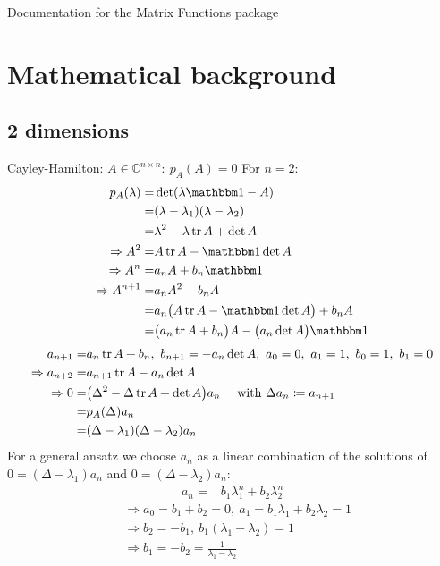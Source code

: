 \documentclass{article}
\begin{document}
\centerline{\sc \large Documentation for the Matrix Functions package}
\vspace{.5pc}
\vspace{2pc}

\tableofcontents

\section{Mathematical background}
\subsection{2 dimensions}
Cayley-Hamilton: $A\in \mathbb C^{n\times n}:\ p_A(A)=0$
For $n=2$:
\begin{align}
p_A(\lambda) =& \det(\lambda\mathbbm 1 - A) \nonumber\\
=& (\lambda - \lambda_1)(\lambda - \lambda_2) \nonumber\\
=& \lambda^2 -\lambda\tr A + \det A\\
\Rightarrow A^2 =& A \tr A - \mathbbm 1 \det A\\
\Rightarrow A^n =& a_n A + b_n\mathbbm 1\\
\Rightarrow A^{n+1} =& a_n A^2 + b_n A \nonumber\\
=& a_n \big( A\tr A - \mathbbm 1\det A \big) + b_n A \nonumber\\
=& \big(a_n\tr A + b_n\big)A - \big(a_n\det A \big)\mathbbm 1 \nonumber
\end{align}
\begin{align}
a_{n+1} =& a_n\tr A + b_n,\ b_{n+1} = -a_n\det A,\ a_0=0,\ a_1=1,\ b_0=1,\ b_1=0 \label{recurrent 2dim}\\
\Rightarrow a_{n+2} =& a_{n+1}\tr A - a_n\det A \nonumber\\
\Rightarrow 0 =& \big(\Delta^2 - \Delta\tr A + \det A\big) a_n\ \ \ \ \text{with}\ \Delta a_n \coloneqq a_{n+1} \nonumber\\
=& p_A(\Delta) a_n\nonumber\\
=& (\Delta-\lambda_1)(\Delta-\lambda_2) a_n
\end{align}
For a general ansatz we choose $a_n$ as a linear combination of the solutions of $0=(\Delta-\lambda_1)a_n$ and $0=(\Delta-\lambda_2)a_n$:
\begin{align}
a_n =& b_1 \lambda_1^n + b_2\lambda_2^n
\end{align}
\begin{align}
&\Rightarrow a_0 = b_1 + b_2 = 0,\ a_1 = b_1\lambda_1 + b_2\lambda_2 = 1 \nonumber\\
&\Rightarrow b_2 = -b_1,\ b_1(\lambda_1 - \lambda_2) = 1 \nonumber\\
&\Rightarrow b_1 = -b_2 = \frac 1 {\lambda_1 - \lambda_2}
\end{align}
\end{document}
